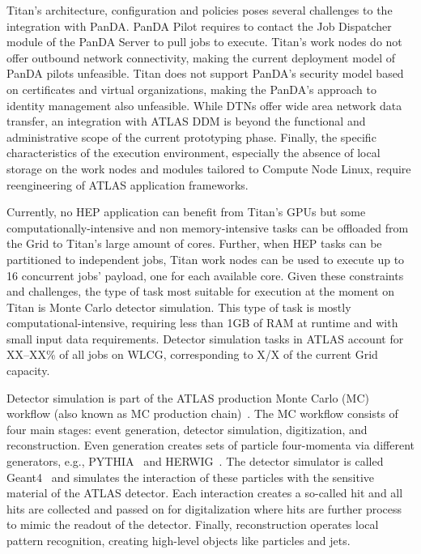 Titan's architecture, configuration and policies poses several challenges to the
integration with PanDA. PanDA Pilot requires to contact the Job Dispatcher
module of the PanDA Server to pull jobs to execute. Titan's work nodes do not
offer outbound network connectivity, making the current deployment model of
PanDA pilots unfeasible. Titan does not support PanDA's security model based on
certificates and virtual organizations, making the PanDA's approach to identity
management also unfeasible. While DTNs offer wide area network data transfer, an
integration with ATLAS DDM is beyond the functional and administrative scope of
the current prototyping phase. Finally, the specific characteristics of the
execution environment, especially the absence of local storage on the work nodes
and modules tailored to Compute Node Linux, require reengineering of ATLAS
application frameworks.

Currently, no HEP application can benefit from Titan's GPUs but some
computationally-intensive and non memory-intensive tasks can be offloaded from
the Grid to Titan's large amount of cores. Further, when HEP tasks can be
partitioned to independent jobs, Titan work nodes can be used to execute up to
16 concurrent jobs' payload, one for each available core. Given these
constraints and challenges, the type of task most suitable for execution at the moment on Titan is Monte Carlo
detector simulation.
This type of task is mostly computational-intensive, requiring less than 1GB of
RAM at runtime and with small input data requirements. Detector simulation tasks
in ATLAS account for XX--XX\% of all jobs on WLCG, corresponding to X/X of the
current Grid capacity.



Detector simulation is part of the ATLAS production Monte Carlo (MC) workflow
(also known as MC production chain)~\cite{mcworkflow}. The MC workflow consists
of four main stages: event generation, detector simulation, digitization, and
reconstruction. Even generation creates sets of particle four-momenta via
different generators, e.g., PYTHIA~\cite{herwig} and HERWIG~\cite{herwig}. The
detector simulator is called Geant4~\cite{geant4} and simulates the interaction
of these particles with the sensitive material of the ATLAS detector. Each
interaction creates a so-called hit and all hits are collected and passed on for
digitalization where hits are further process to mimic the readout of the
detector. Finally, reconstruction operates local pattern recognition, creating
high-level objects like particles and jets.

